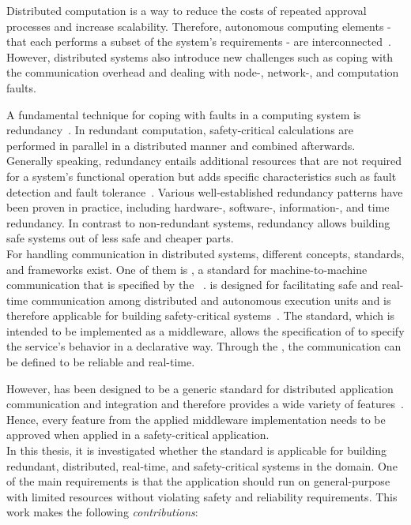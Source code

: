 Distributed computation is a way to reduce the costs of repeated approval processes and increase scalability.
Therefore, autonomous computing elements - that each performs a subset of the system's requirements - are interconnected~\cite{DistributedSafety2020}.
However, distributed systems also introduce new challenges such as coping with the communication overhead and dealing with node-, network-, and computation faults.

A fundamental technique for coping with faults in a computing system is redundancy~\cite{TanenbaumSteen07}.
In redundant computation, safety-critical calculations are performed in parallel in a distributed manner and combined afterwards.
Generally speaking, redundancy entails additional resources that are not required for a system's functional operation but adds specific characteristics such as fault detection and fault tolerance~\cite{BarryFaultToleranceAnalysis}.
Various well-established redundancy patterns have been proven in practice, including hardware-, software-, information-, and time redundancy.
In contrast to non-redundant systems, redundancy allows building safe systems out of less safe and cheaper parts.
\\

For handling communication in distributed systems, different concepts, standards, and frameworks exist.
One of them is , a  standard for machine-to-machine communication that is specified by the ~\cite{omgDDSspec}.
 is designed for facilitating safe and real-time communication among distributed and autonomous execution units and is therefore applicable for building safety-critical systems~\cite{DistributedSafety2020}.
The standard, which is intended to be implemented as a middleware, allows the specification of  to specify the service's behavior in a declarative way.
Through the , the communication can be defined to be reliable and real-time.

However,  has been designed to be a generic standard for distributed application communication and integration and therefore provides a wide variety of features~\cite{omgDDSspec}.
Hence, every feature from the applied middleware implementation needs to be approved when applied in a safety-critical application.
\\

In this thesis, it is investigated whether the  standard is applicable for building redundant, distributed, real-time, and safety-critical systems in the  domain.
One of the main requirements is that the application should run on general-purpose  with limited resources without violating safety and reliability requirements.
This work makes the following \textit{contributions}:

